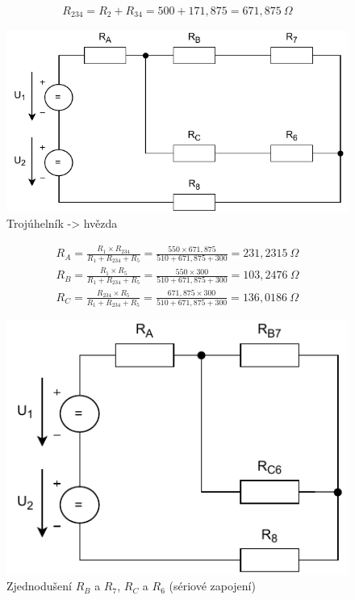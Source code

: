 \begin{center}
    \begin{gather*}
        R_{234} = R_2 + R_{34} = 500 + 171,875 = 671,875 \: \Omega
    \end{gather*}
\end{center}

\begin{figure}[h]
    \centering
    \includegraphics[scale=0.8,keepaspectratio]{fig/Pr1_krok3.pdf}
    \caption{Trojúhelník -> hvězda}
    \label{pic:Pr1_krok3}
\end{figure}

\begin{center}
    \begin{gather*}
        R_A = \frac{R_1 \times R_{234}}{R_1+R_{234}+R_5} = \frac{550 \times 671,875}{510+671,875+300} = 231,2315 \: \Omega \\[6pt]
        R_B = \frac{R_1 \times R_5}{R_1+R_{234}+R_5} = \frac{550 \times 300}{510+671,875+300} = 103,2476 \: \Omega \\[6pt]
        R_C = \frac{R_{234} \times R_5}{R_1+R_{234}+R_5} = \frac{671,875 \times 300}{510+671,875+300} = 136,0186 \: \Omega
    \end{gather*}
\end{center}

\newpage

\begin{figure}[h]
    \centering
    \includegraphics[scale=0.8,keepaspectratio]{fig/Pr1_krok4.pdf}
    \caption{Zjednodušení $R_B$ a $R_7$, $R_C$ a $R_6$ (sériové zapojení)}
    \label{pic:Pr1_krok4}
\end{figure}

